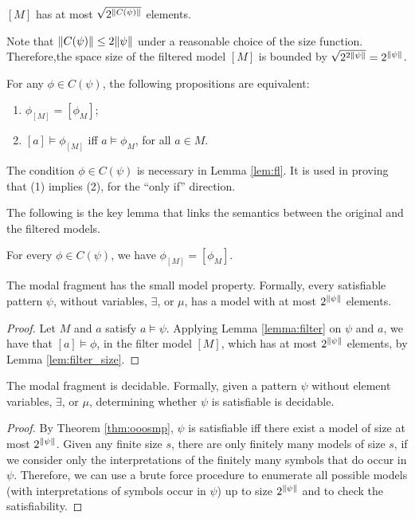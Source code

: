 \begin{lemma}\label{lem:filter_size}
$[M]$ has at most $\sqrt{2^{\left\lVert C(\psi)\right\rVert}}$ elements.
\end{lemma}

Note that \(\left\lVert C(\psi)\right\rVert \le 2{\left\lVert \psi\right\rVert}\) under a reasonable choice of the
size function.
Therefore,the space size of the filtered model \([M]\) is bounded by
\(\sqrt{2^{2\left\lVert \psi\right\rVert}} = 2^{\left\lVert \psi\right\rVert}\).

\begin{lemma}\label{lem:fl}
For any $\phi \in C(\psi)$, the following propositions are equivalent:
\begin{enumerate}
\item $\phi_{[M]} = [\phi_M]$;
\item $[a] \vDash \phi_{[{M}]}$ iff $a \vDash \phi_M$, for all $a \in M$.
\end{enumerate}
\end{lemma}

\begin{remark}
The condition $\phi \in C(\psi)$ is necessary in Lemma \ref{lem:fl}.
It is used in proving that (1) implies (2), for the ``only if'' direction.
\end{remark}

The following is the key lemma that links the semantics
between the original and the filtered models.

\begin{lemma}\label{lemma:filter}
For every $\phi \in C(\psi)$,  we have 
$\phi_{[M]} = [\phi_M]$.
\end{lemma}

\begin{theorem}\label{thm:ooosmp}
The modal fragment has the small model property. Formally, 
every satisfiable pattern $\psi$, without variables, $\exists$, or $\mu$,
has a model with at most ${2^{\left\lVert \psi\right\rVert}}$ 
elements.
\end{theorem}
\begin{proof}
Let $M$ and $a$ satisfy $a \vDash \psi$.
Applying Lemma \ref{lemma:filter} on $\psi$ and $a$,
we have that $[a] \vDash \phi$, in the filter model $[M]$,
which has at most ${2^{\left\lVert \psi\right\rVert}}$ 
elements, by Lemma \ref{lem:filter_size}.
\end{proof}

\begin{theorem}\label{thm:ooodec}
The modal fragment is decidable.
Formally, given a pattern $\psi$ without element variables, $\exists$, or 
$\mu$, determining whether $\psi$ is satisfiable is decidable.
\end{theorem}
\begin{proof}
By Theorem \ref{thm:ooosmp}, $\psi$ is satisfiable iff
there exist a model of size at most ${2^{\left\lVert \psi\right\rVert}}$.
Given any finite size $s$, there are only finitely many models of size $s$,
if we consider only the interpretations of the finitely many symbols that do 
occur in $\psi$.
Therefore, we can use a brute force procedure to enumerate
all possible models (with interpretations of symbols occur in $\psi$)
up to size ${2^{\left\lVert \psi\right\rVert}}$ and to check the satisfiability.
\end{proof}

